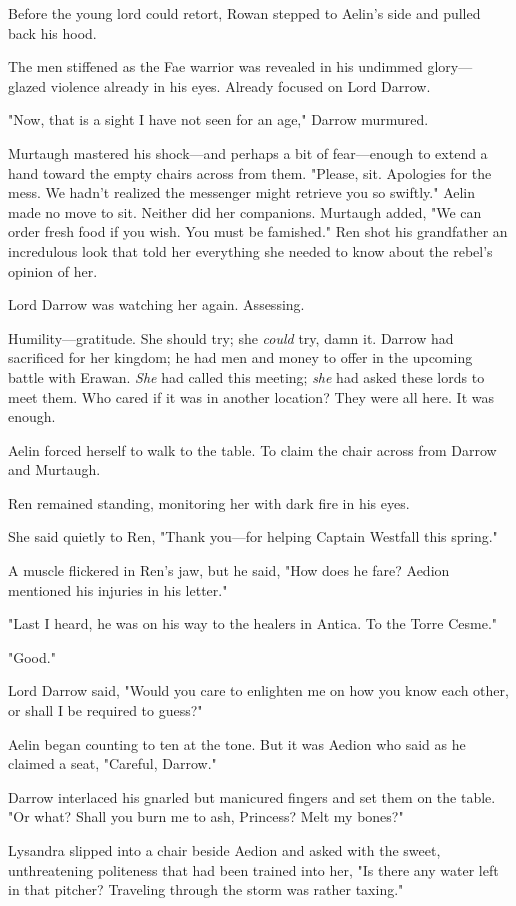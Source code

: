 Before the young lord could retort, Rowan stepped to Aelin's side and pulled back his hood.

The men stiffened as the Fae warrior was revealed in his undimmed glory--- glazed violence already in his eyes. Already focused on Lord Darrow.

"Now, that is a sight I have not seen for an age," Darrow murmured.

Murtaugh mastered his shock---and perhaps a bit of fear---enough to extend a hand toward the empty chairs across from them. "Please, sit. Apologies for the mess. We hadn't realized the messenger might retrieve you so swiftly." Aelin made no move to sit. Neither did her companions. Murtaugh added, "We can order fresh food if you wish. You must be famished." Ren shot his grandfather an incredulous look that told her everything she needed to know about the rebel's opinion of her.

Lord Darrow was watching her again. Assessing.

Humility---gratitude. She should try; she \emph{could} try, damn it. Darrow had sacrificed for her kingdom; he had men and money to offer in the upcoming battle with Erawan. \emph{She} had called this meeting;
\emph{she} had asked these lords to meet them. Who cared if it was in another location? They were all here. It was enough.

Aelin forced herself to walk to the table. To claim the chair across from Darrow and Murtaugh.

Ren remained standing, monitoring her with dark fire in his eyes.

She said quietly to Ren, "Thank you---for helping Captain Westfall this spring."

A muscle flickered in Ren's jaw, but he said, "How does he fare? Aedion mentioned his injuries in his letter."

"Last I heard, he was on his way to the healers in Antica. To the Torre Cesme."

"Good."

Lord Darrow said, "Would you care to enlighten me on how you know each other, or shall I be required to guess?"

Aelin began counting to ten at the tone. But it was Aedion who said as he claimed a seat, "Careful, Darrow."

Darrow interlaced his gnarled but manicured fingers and set them on the table. "Or what? Shall you burn me to ash, Princess? Melt my bones?"

Lysandra slipped into a chair beside Aedion and asked with the sweet, unthreatening politeness that had been trained into her, "Is there any water left in that pitcher? Traveling through the storm was rather taxing."

